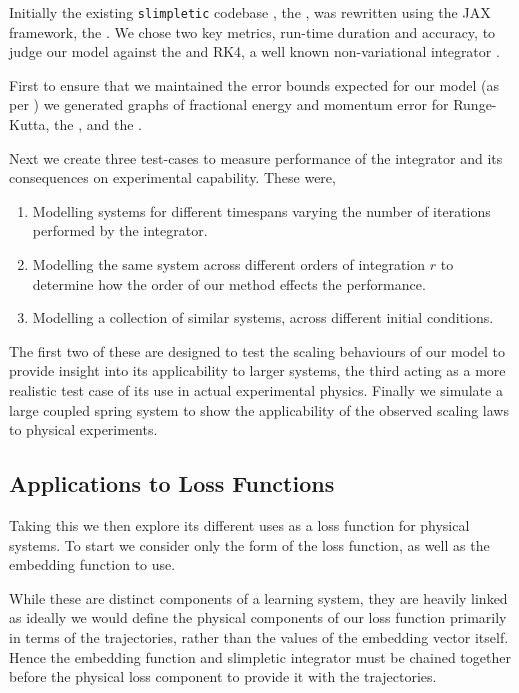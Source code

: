 Initially the existing \texttt{slimpletic} codebase \cite{originalCode}, the \orgimpl{}, was rewritten using the JAX framework, the \updimpl{}. We chose two key metrics, run-time duration and accuracy, to judge our model against the \orgimpl{} and RK4, a well known non-variational integrator . 

First to ensure that we maintained the error bounds expected for our model (as per ) we generated graphs of fractional energy and momentum error for Runge-Kutta, the \orgimpl{}, and the \updimpl{}.

Next we create three test-cases to measure performance of the integrator and its consequences on experimental capability. These were,

\begin{enumerate}
	\item Modelling systems for different timespans varying the number of iterations performed by the integrator.
	\item Modelling the same system across different orders of integration $r$ to determine how the order of our method effects the performance.
	\item Modelling a collection of similar systems, across different initial conditions.
\end{enumerate}

The first two of these are designed to test the scaling behaviours of our model to provide insight into its applicability to larger systems, the third acting as a more realistic test case of its use in actual experimental physics. Finally we simulate a large coupled spring system to show the applicability of the observed scaling laws to physical experiments.

\subsection{Applications to Loss Functions}

Taking this \updimpl{} we then explore its different uses as a loss function for physical systems. To start we consider only the form of the loss function, as well as the embedding function to use.


While these are distinct components of a learning system, they are heavily linked as ideally we would define the physical components of our loss function primarily in terms of the trajectories, rather than the values of the embedding vector itself. Hence the embedding function and slimpletic integrator must be chained together before the physical loss component to provide it with the trajectories.

